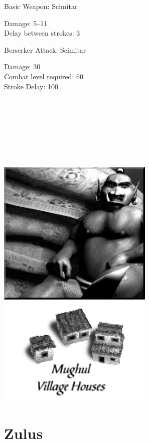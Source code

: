 Basic Weapon: Scimitar
\begin{adjustwidth}{1cm}{}
	Damage: 5–11 \\
	Delay between strokes: 3
\end{adjustwidth}
Berserker Attack: Scimitar
\begin{adjustwidth}{1cm}{}
	Damage: 30 \\
	Combat level required: 60 \\
	Stroke Delay: 100 \\ \\ \\ \\ \\ \\ \\ \\ 
\end{adjustwidth}

\begin{center}
	\includegraphics[width=74.25mm]{Adjinni}\includegraphics[width=74.25mm]{Imughalhouse}
\end{center}

\clearpage

\section{Zulus}

